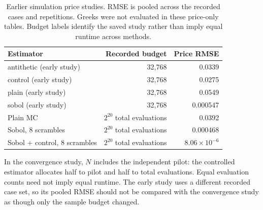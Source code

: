 \begin{table}[!ht]\centering\small
\caption{Earlier simulation price studies. RMSE is pooled across the recorded cases and repetitions. Greeks were not evaluated in these price-only tables. Budget labels identify the saved study rather than imply equal runtime across methods.}
\begin{tabular}{lrr}\toprule
Estimator & Recorded budget & Price RMSE\\\midrule
antithetic (early study) & 32,768 & 0.0339\\
control (early study) & 32,768 & 0.0275\\
plain (early study) & 32,768 & 0.0549\\
sobol (early study) & 32,768 & 0.000547\\
\midrule
Plain MC & $2^{20}$ total evaluations & 0.0392\\
Sobol, 8 scrambles & $2^{20}$ total evaluations & 0.000468\\
Sobol + control, 8 scrambles & $2^{20}$ total evaluations & $8.06\times10^{-6}$\\
\bottomrule\end{tabular}
\par\smallskip\parbox{.93\textwidth}{\footnotesize In the convergence study, $N$ includes the independent pilot: the controlled estimator allocates half to pilot and half to total evaluations. Equal evaluation counts need not imply equal runtime. The early study uses a different recorded case set, so its pooled RMSE should not be compared with the convergence study as though only the sample budget changed.}
\end{table}

